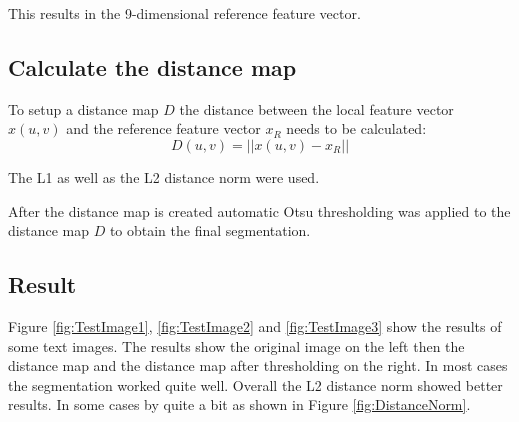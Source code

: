 This results in the 9-dimensional reference feature vector.

\subsection{Calculate the distance map}
To setup a distance map $D$ the distance between the local feature vector $x(u,v)$ and the reference feature vector $x_R$ needs to be calculated:
\begin{equation}
	D(u,v) = ||x(u,v) - x_R||
\end{equation}

The L1 as well as the L2 distance norm were used.

After the distance map is created automatic Otsu thresholding was applied to the distance map $D$ to obtain the final segmentation.

\subsection{Result}

Figure \ref{fig:TestImage1}, \ref{fig:TestImage2} and \ref{fig:TestImage3} show the results of some text images. The results show the original image on the left then the distance map and the distance map after thresholding on the right. In most cases the segmentation worked quite well.
Overall the L2 distance norm showed better results. In some cases by quite a bit as shown in Figure \ref{fig:DistanceNorm}.

